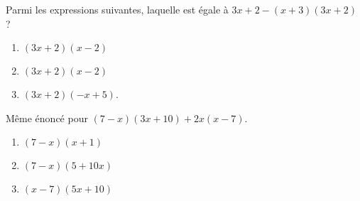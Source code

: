 
\begin{exercice}\label{exosmath-0343}

    Parmi les expressions suivantes, laquelle est égale à \( 3x+2-(x+3)(3x+2)\) ?
    \begin{enumerate}
        \item
            \( (3x+2)(x-2)\)
        \item
            \( (3x+2)(x-2)\)
        \item
            \( (3x+2)(-x+5)\).
    \end{enumerate}
    Même énoncé pour \( (7-x)(3x+10)+2x(x-7)\).
    \begin{enumerate}
        \item
            \( (7-x)(x+1)\)
        \item
            \( (7-x)(5+10x)\)
        \item
            \( (x-7)(5x+10)\)
    \end{enumerate}

\end{exercice}
